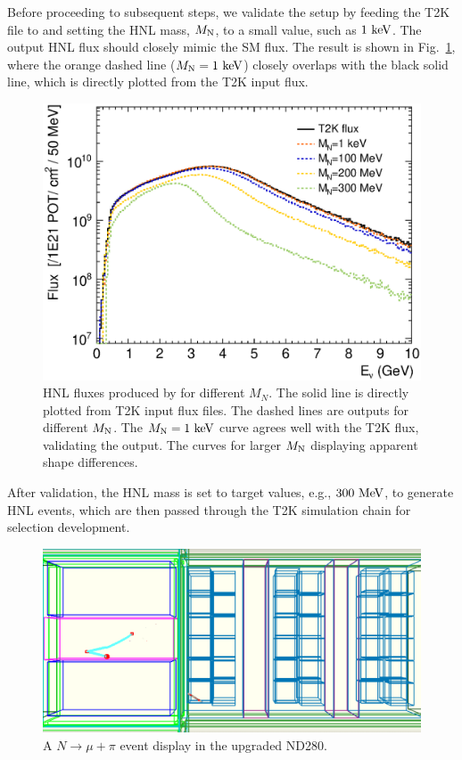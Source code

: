         Before proceeding to subsequent steps, we validate the setup by feeding the T2K  file to  and setting the HNL mass, $M_{\textrm{N}}$, to a small value, such as $1~\textrm{keV}$. 
        The output HNL flux should closely mimic the SM flux. 
        The result is shown in Fig.~\ref{fig:hnl-fluxes}, where the orange dashed line ($M_{\textrm{N}}=1~\textrm{keV}$) closely overlaps with the black solid line, which is directly plotted from the T2K input flux.  
        \begin{figure}[!htb] 
            \centering 		
            \includegraphics[width=\sgfigwid\textwidth]{figures/hnl/hnl_fluxes_less.eps}
            \caption{\label{fig:hnl-fluxes} HNL fluxes produced by  for different $M_N$. The solid line is directly plotted from T2K input flux files. The dashed lines are  outputs for different $M_{\textrm{N}}$. The $M_{\textrm{N}}=1~\textrm{keV}$ curve agrees well with the T2K flux, validating the \beamHNL output. The curves for larger $M_{\textrm{N}}$ displaying apparent shape differences.} 
        \end{figure}
        After validation, the HNL mass is set to target values, e.g., $300~\textrm{MeV}$, to generate HNL events, which are then passed through the T2K simulation chain for selection development. 
        \begin{figure}[!htb] 
            \centering 		
            \includegraphics[width=\sgfigwid\textwidth]{figures/HNLEveDIs.png}
            \caption{\label{fig:hnl-evedis} A $N\rightarrow\mu+\pi$ event display in the upgraded ND280.} 
        \end{figure}

